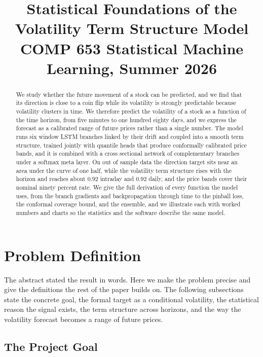\documentclass[12pt,letterpaper]{article}
\title{Statistical Foundations of the Volatility Term Structure Model \\
       \large COMP 653 Statistical Machine Learning, Summer 2026}
\author{}
\date{}
\begin{document}
\maketitle

\begin{abstract}
We study whether the future movement of a stock can be predicted, and we find
that its direction is close to a coin flip while its volatility is strongly
predictable because volatility clusters in time. We therefore predict the
volatility of a stock as a function of the time horizon, from five minutes to one
hundred eighty days, and we express the forecast as a calibrated range of future
prices rather than a single number. The model runs six window LSTM branches
linked by their drift and coupled into a smooth term structure, trained jointly
with quantile heads that produce conformally calibrated price bands, and it is
combined with a cross sectional network of complementary branches under a softmax
meta layer. On out of sample data the direction target sits near an area under
the curve of one half, while the volatility term structure rises with the horizon
and reaches about $0.92$ intraday and $0.92$ daily, and the price bands cover
their nominal ninety percent rate. We give the full derivation of every function
the model uses, from the branch gradients and backpropagation through time to the
pinball loss, the conformal coverage bound, and the ensemble, and we illustrate
each with worked numbers and charts so the statistics and the software describe
the same model.
\end{abstract}

\tableofcontents
\clearpage

\section{Problem Definition}

The abstract stated the result in words. Here we make the problem precise and
give the definitions the rest of the paper builds on. The following subsections
state the concrete goal, the formal target as a conditional volatility, the
statistical reason the signal exists, the term structure across horizons, and the
way the volatility forecast becomes a range of future prices.

\subsection{The Project Goal}
\end{document}
